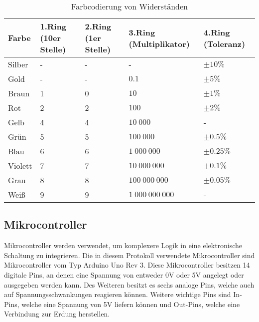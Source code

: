 \begin{table}
    \begin{adjustwidth}{-2cm}{}
        \caption{Farbcodierung von Widerständen}
        \label{tab:farbcodierung-von-widerständen}
        \begin{tabular}{| l | l | l | l | l |}
            \hline
            Farbe   & 1.Ring (10er Stelle) & 2.Ring (1er Stelle) & 3.Ring (Multiplikator) & 4.Ring (Toleranz) \\
            \hline
            Silber  & -                    & -                   & -                      & $\pm 10\%$        \\
            Gold    & -                    & -                   & $0.1$                  & $\pm 5\%$         \\
            Braun   & 1                    & 0                   & $10$                   & $\pm 1\%$         \\
            Rot     & 2                    & 2                   & $100$                  & $\pm 2\%$         \\
            Gelb    & 4                    & 4                   & $10\ 000$              & -                 \\
            Grün    & 5                    & 5                   & $100\ 000$             & $\pm 0.5\%$       \\
            Blau    & 6                    & 6                   & $1\ 000\ 000$          & $\pm 0.25\%$      \\
            Violett & 7                    & 7                   & $10\ 000\ 000$         & $\pm 0.1\%$       \\
            Grau    & 8                    & 8                   & $100\ 000\ 000$        & $\pm 0.05\%$      \\
            Weiß    & 9                    & 9                   & $1\ 000\ 000\ 000$     & -                 \\
            \hline
        \end{tabular}
    \end{adjustwidth}
\end{table}

\subsection{Mikrocontroller \cite{arduino-r3}}
\label{subsec:mikrocontroller}

Mikrocontroller werden verwendet, um komplexere Logik in eine elektronische Schaltung zu integrieren.
Die in diesem Protokoll verwendete Mikrocontroller sind Mikrocontroller vom Typ Arduino Uno Rev 3.
Diese Mikrocontroller besitzen 14 digitale Pins, an denen eine Spannung von entweder 0V oder 5V angelegt oder ausgegeben werden kann.
Des Weiteren besitzt es sechs analoge Pins, welche auch auf Spannungsschwankungen reagieren können.
Weitere wichtige Pins sind In-Pins, welche eine Spannung von 5V liefern können und Out-Pins, welche eine Verbindung zur Erdung herstellen.


